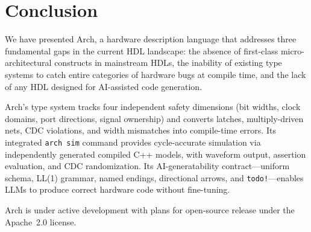 \documentclass[manuscript]{acmart}
\begin{document}
\section{Conclusion}\label{sec:conclusion}

We have presented Arch, a hardware description language that addresses three fundamental gaps in the current HDL landscape: the absence of first-class micro-architectural constructs in mainstream HDLs, the inability of existing type systems to catch entire categories of hardware bugs at compile time, and the lack of any HDL designed for AI-assisted code generation.

Arch's type system tracks four independent safety dimensions (bit widths, clock domains, port directions, signal ownership) and converts latches, multiply-driven nets, CDC violations, and width mismatches into compile-time errors.
Its integrated \texttt{arch sim} command provides cycle-accurate simulation via independently generated compiled C++ models, with waveform output, assertion evaluation, and CDC randomization.
Its AI-generatability contract---uniform schema, LL(1) grammar, named endings, directional arrows, and \texttt{todo!}---enables LLMs to produce correct hardware code without fine-tuning.

Arch is under active development with plans for open-source release under the Apache~2.0 license.


\end{document}
